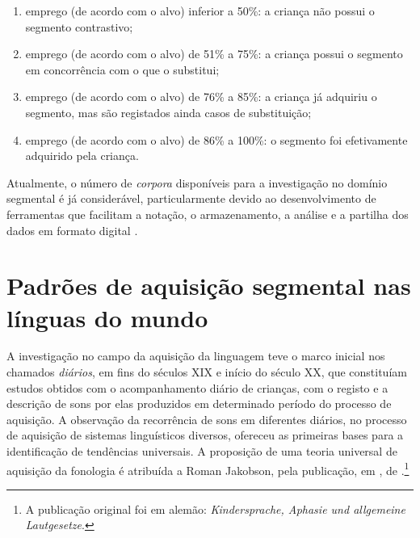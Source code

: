 \documentclass[output=paper]{LSP/langsci}
\begin{document}
\begin{enumerate}[label=\alph*)]
\item emprego (de acordo com o alvo) inferior a 50\%: a criança não possui o segmento contrastivo;
\item emprego (de acordo com o alvo) de 51\% a 75\%: a criança possui o segmento em concorrência com o que o substitui;
\item emprego (de acordo com o alvo) de 76\% a 85\%: a criança já adquiriu o segmento, mas são registados ainda casos de substituição; 
\item emprego (de acordo com o alvo) de 86\% a 100\%: o segmento foi efetivamente adquirido pela criança.
\end{enumerate}

Atualmente, o número de \textit{corpora} disponíveis para a investigação no domínio segmental é já considerável, particularmente devido ao desenvolvimento de ferramentas que facilitam a notação, o armazenamento, a análise e a partilha dos dados em formato digital  \citep{durand_etal2014}.

\section{Padrões de aquisição segmental nas línguas do mundo}
\label{sec:matzenauer_padroes_mundo}

A investigação no campo da aquisição da linguagem teve o marco inicial nos chamados \textit{diários}, em fins do séculos XIX e início do século XX, que constituíam estudos obtidos com o acompanhamento diário de crianças, com o registo e a descrição de sons por elas produzidos em determinado período do processo de aquisição. A observação da recorrência de sons em diferentes diários, no processo de aquisição de sistemas linguísticos diversos, ofereceu as primeiras bases para a identificação de tendências universais. A proposição de uma teoria universal de aquisição da fonologia é atribuída a Roman Jakobson, pela publicação, em \citeyear{jakobson1941}, de .\footnote{A publicação original foi em alemão: \textit{Kindersprache, Aphasie und allgemeine Lautgesetze}.}
\end{document}
